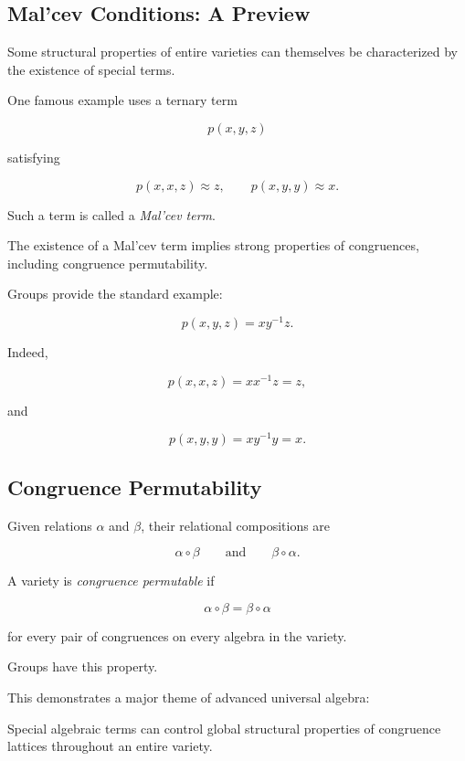 \subsection{Mal'cev Conditions: A Preview}
\label{subsec:malcev-preview}

Some structural properties of entire varieties can themselves be
characterized by the existence of special terms.

One famous example uses a ternary term

\[ p(x,y,z) \]

satisfying

\[ p(x,x,z)\approx z,\qquad p(x,y,y)\approx x. \]

Such a term is called a \emph{Mal'cev term}.

The existence of a Mal'cev term implies strong properties of congruences,
including congruence permutability.

Groups provide the standard example:

\[ p(x,y,z)=xy^{-1}z. \]

Indeed,

\[ p(x,x,z)=xx^{-1}z=z, \]

and

\[ p(x,y,y)=xy^{-1}y=x. \]

\subsection{Congruence Permutability}
\label{subsec:congruence-permutability}

Given relations \(\alpha\) and \(\beta\), their relational compositions are

\[ \alpha\circ\beta
\qquad\text{and}\qquad
\beta\circ\alpha. \]

A variety is \emph{congruence permutable} if

\[ \alpha\circ\beta=\beta\circ\alpha \]

for every pair of congruences on every algebra in the variety.

Groups have this property.

This demonstrates a major theme of advanced universal algebra:

\begin{conceptbox}
Special algebraic terms can control global structural properties of
congruence lattices throughout an entire variety.
\end{conceptbox}

